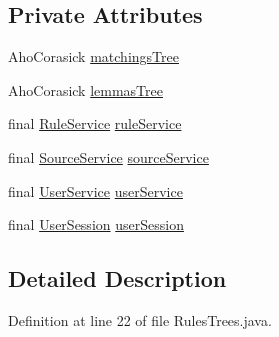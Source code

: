 \subsection*{Private Attributes}
\begin{DoxyCompactItemize}
\item 
Aho\+Corasick \hyperlink{classbr_1_1usp_1_1cata_1_1util_1_1_rules_trees_a3e326a07d34a8f0fdd58b5901098d534}{matchings\+Tree}
\item 
Aho\+Corasick \hyperlink{classbr_1_1usp_1_1cata_1_1util_1_1_rules_trees_a8c396a47e167ded77451bab3aed52684}{lemmas\+Tree}
\item 
final \hyperlink{classbr_1_1usp_1_1cata_1_1service_1_1_rule_service}{Rule\+Service} \hyperlink{classbr_1_1usp_1_1cata_1_1util_1_1_rules_trees_a93fb83138e4ab0938c34e06d3eb3b48a}{rule\+Service}
\item 
final \hyperlink{classbr_1_1usp_1_1cata_1_1service_1_1_source_service}{Source\+Service} \hyperlink{classbr_1_1usp_1_1cata_1_1util_1_1_rules_trees_a891861c5b386059c58675590a8878176}{source\+Service}
\item 
final \hyperlink{classbr_1_1usp_1_1cata_1_1service_1_1_user_service}{User\+Service} \hyperlink{classbr_1_1usp_1_1cata_1_1util_1_1_rules_trees_acc11381172d0de06c7710395f7499844}{user\+Service}
\item 
final \hyperlink{classbr_1_1usp_1_1cata_1_1web_1_1controller_1_1_user_session}{User\+Session} \hyperlink{classbr_1_1usp_1_1cata_1_1util_1_1_rules_trees_aae7be5fb6afb386509a5b91c91b8c559}{user\+Session}
\end{DoxyCompactItemize}


\subsection{Detailed Description}


Definition at line 22 of file Rules\+Trees.\+java.



